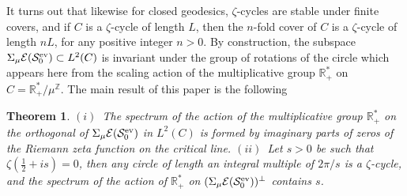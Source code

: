 \documentclass[cupthm]{CUP-JNL-JMJ}
\def\R{{\mathbb R}}
\def\Z{{\mathbb Z}}
\def\cE{{\mathcal E}}
\def\cS{{\mathcal S}}
\def\sr0{{\cS^{\rm ev}_0}}
\numberwithin{equation}{section}
\theoremstyle{cupplain}
\newtheorem{theorem}{Theorem}[section]
\theoremstyle{cupdefinition}
\theoremstyle{cupremark}
\theoremstyle{cupproof}
\begin{document}
It turns out that likewise for closed geodesics,  $\zeta$-cycles are stable under finite covers, and if $C$ is a $\zeta$-cycle of length $L$, then 
 the $n$-fold cover of $C$ is a $\zeta$-cycle of length $nL$, for any positive integer $n>0$.\newline
By construction, the subspace $\Sigma_\mu \cE(\sr0)\subset L^2(C)$ is invariant under the group of rotations of the circle which appears here from  the scaling action of the multiplicative group $\R_+^*$ on $C=\R_+^*/\mu^\Z$. The main result of this paper is the following 
\begin{theorem}\label{introspectralreal} $(i)$~The spectrum of the action of the multiplicative group $\R_+^*$ on the orthogonal  of $\Sigma_\mu \cE(\sr0)$ in $L^2(C)$ is formed by imaginary parts of zeros of the Riemann zeta function on the critical line.\newline
$(ii)$~Let $s>0$ be such that $\zeta(\frac 12+is)=0$, then any circle of length an integral multiple of $2\pi /s$ is a $\zeta$-cycle, and the spectrum of the action of $\R_+^*$ on  $(\Sigma_\mu \cE(\sr0))^\perp$ contains $s$.\end{theorem}
\end{document}
